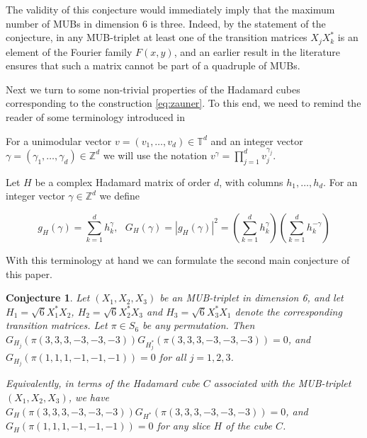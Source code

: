 \documentclass[12pt]{amsart}
\numberwithin{equation}{section}
\newcommand{\Z}{\mathbb{Z}}
\newtheorem{conjecture}{Conjecture}
\theoremstyle{definition}
\theoremstyle{remark}
\theoremstyle{remark}
\newcommand{\TT}{\ensuremath{\mathbb{T}}}
\begin{document}
The validity of this conjecture would immediately imply that the maximum number of MUBs in dimension 6 is three. Indeed, by the statement of the conjecture, in any MUB-triplet at least one of the transition matrices $X_jX^\ast_k$ is an element of the Fourier family $F(x,y)$, and an earlier result in the literature \cite{arxiv} ensures that such a matrix cannot be part of a quadruple of MUBs. 


\medskip

Next we turn to some non-trivial properties of the Hadamard cubes corresponding to the construction \eqref{eq:zauner}. To this end, we need to remind the reader of some terminology introduced in \cite{mubmols}

\medskip

For a unimodular vector $v=(v_1, \dots, v_d)\in \TT^d$ and an integer vector $\gamma=(\gamma_1, \dots, \gamma_d)\in \Z^d$ we will use the notation $v^\gamma=\prod_{j=1}^d v_j^{\gamma_j}$. 

\medskip

Let $H$ be a complex Hadamard matrix of order $d$, with columns $h_1, \dots, h_d$. For an integer vector $\gamma\in \Z^d$ we define

\begin{equation}\label{gG}
g_H(\gamma)=\sum_{k=1}^d h_k^\gamma, \ \ \ G_H(\gamma)=|g_H(\gamma)|^2=  \left (\sum_{k=1}^d h_k^\gamma \right )\left (\sum_{k=1}^d h_k^{-\gamma}\right )
\end{equation}

With this terminology at hand we can formulate the second main conjecture of this paper. 

\medskip

\begin{conjecture}\label{gg}
Let $(X_1, X_2, X_3)$ be an MUB-triplet in dimension 6, and let $H_1=\sqrt{6}X_1^\ast X_2$, $H_2=\sqrt{6}X_2^\ast X_3$ and $H_3=\sqrt{6}X_3^\ast X_1$ denote the corresponding transition matrices. Let $\pi\in S_6$ be any permutation. Then $G_{H_j}(\pi (3,3,3,-3,-3,-3))G_{H^\ast_j}(\pi (3,3,3,-3,-3,-3))=0$, and $G_{H_j}(\pi(1,1,1,-1,-1,-1))=0$ for all $j=1,2,3$.

Equivalently, in terms of the Hadamard cube $C$ associated with the MUB-triplet $(X_1, X_2, X_3)$, we have $G_{H}(\pi (3,3,3,-3,-3,-3))G_{H^\ast}(\pi (3,3,3,-3,-3,-3))=0$, and $G_H(\pi(1,1,1,-1,-1,-1))=0$ for any slice $H$ of the cube $C$.
\end{conjecture}

\medskip
\end{document}
